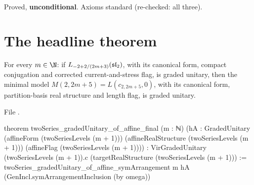 \begin{status}
Proved, \textbf{unconditional}. Axioms standard (re-checked: all three).
\end{status}

\section{The headline theorem}\label{l29:sec:headline}

\begin{theorem}\label{l29:thm:final}
For every $m\in\N$: if $L_{-2+2/(2m+3)}(\mathfrak{sl}_2)$, with its canonical form, compact conjugation and corrected
current-and-stress flag, is graded unitary, then the minimal model $M(2,2m+5)=L(c_{2,2m+5},0)$, with its canonical form,
partition-basis real structure and length flag, is graded unitary.
\end{theorem}

\noindent File .
\begin{leancode}
theorem twoSeries_gradedUnitary_of_affine_final (m : ℕ)
    (hA : GradedUnitary (affineForm (twoSeriesLevels (m + 1)))
      (affineRealStructure (twoSeriesLevels (m + 1))) (affineFlag (twoSeriesLevels (m + 1)))) :
    VirGradedUnitary (twoSeriesLevels (m + 1)).c (targetRealStructure (twoSeriesLevels (m + 1))) :=
  twoSeries_gradedUnitary_of_affine_symArrangement m hA
    (GenIncl.symArrangementInclusion (by omega))
\end{leancode}

